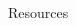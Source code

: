 \documentclass[shownotes,12pt, aspectratio=169]{beamer}
\begin{document}
\begin{frame}[t]{Resources}
\begin{columns}
\begin{column}[T]{0.5\textwidth}
\end{column}
\hfill
\pause
\begin{column}[T]{0.5\textwidth}
\end{column}
\end{columns}
\end{frame}
\end{document}
